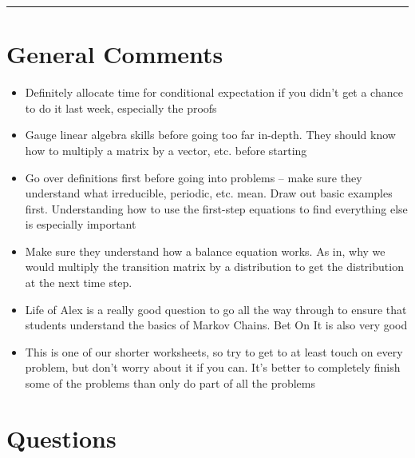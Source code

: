\documentclass{exam}
\title{}
\date{Markov Chains, Continuous Probability, Conditional Expectation}
\begin{document}
\maketitle
\rule{\textwidth}{0.15em}
\fontsize{12}{15}\selectfont
\thispagestyle{empty}


\section{General Comments}
\begin{itemize}
\item Definitely allocate time for conditional expectation if you didn't get a chance to do it last week, especially the proofs
\item Gauge linear algebra skills before going too far in-depth. They should know how to multiply a matrix by a vector, etc. before starting
\item Go over definitions first before going into problems – make sure they understand what irreducible, periodic, etc. mean. Draw out basic examples first. Understanding how to use the first-step equations to find everything else is especially important

\item Make sure they understand how a balance equation works. As in, why we would multiply the transition matrix by a distribution to get the distribution at the next time step.




\item Life of Alex is a really good question to go all the way through to ensure that students understand the basics of Markov Chains. Bet On It is also very good

\item This is one of our shorter worksheets, so try to get to at least touch on every problem, but don't worry about it if you can. It's better to completely finish some of the problems than only do part of all the problems
\end{itemize}


\section{Questions}
\end{document}
